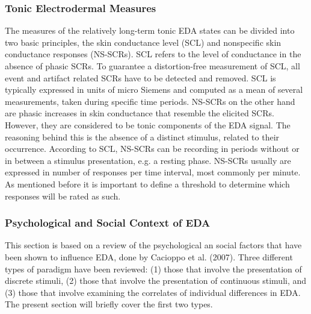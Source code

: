 \subsubsection{Tonic Electrodermal Measures}
The measures of the relatively long-term tonic EDA states can be divided into two basic principles, the skin conductance level (SCL) and nonspecific skin conductance responses (NS-SCRs). SCL refers to the level of conductance in the absence of phasic SCRs. To guarantee a distortion-free measurement of SCL, all event and artifact related SCRs have to be detected and removed. SCL is typically expressed in units of micro Siemens and computed as a mean of several measurements, taken during specific time periods.
NS-SCRs on the other hand are phasic increases in skin conductance that resemble the elicited SCRs. However, they are considered to be tonic components of the EDA signal. The reasoning behind this is the absence of a distinct stimulus, related to their occurrence. According to SCL, NS-SCRs can be recording in periods without or in between a stimulus presentation, e.g. a resting phase. NS-SCRs usually are expressed in number of responses per time interval, most commonly per minute. As mentioned before it is important to define a threshold to determine which responses will be rated as such.

\subsubsection{Psychological and Social Context of EDA}
This section is based on a review of the psychological an social factors that have been shown to influence EDA, done by Cacioppo et al. (2007). Three different types of paradigm have been reviewed: (1) those that involve the presentation of discrete stimuli, (2) those that involve the presentation of continuous stimuli, and (3) those that involve examining the correlates of individual differences in EDA. The present section will briefly cover the first two types.

